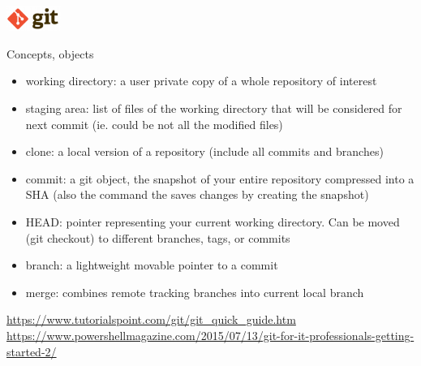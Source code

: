\begin{frame}{\includegraphics[height=0.8cm]{shared/logo-git.png}}
\begin{block}{Concepts, objects}
\begin{itemize}
    \item working directory: a user private copy of a whole repository of interest
    \item staging area: list of files of the working directory that will be considered for next commit (ie. could be not all the modified files)
    \item clone: a local version of a repository (include all commits and branches)
    \item commit: a git object, the snapshot of your entire repository compressed into a SHA (also the command the saves changes by creating the snapshot)
    \item HEAD: pointer representing your current working directory. Can be moved (git checkout) to different branches, tags, or commits 
    \item branch: a lightweight movable pointer to a commit
    \item merge: combines remote tracking branches into current local branch
\end{itemize}
\end{block}
\tiny{
   \url{https://www.tutorialspoint.com/git/git_quick_guide.htm}\\
   \url{https://www.powershellmagazine.com/2015/07/13/git-for-it-professionals-getting-started-2/}
}
\end{frame}

